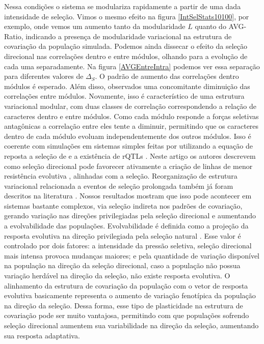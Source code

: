 Nessa condições o sistema se modulariza rapidamente a partir de uma dada
intensidade de seleção.
Vimos o mesmo efeito na figura \ref{IntSelStats10100}, por exemplo, onde
vemos um aumento tanto da modularidade $L$ quanto do AVG-Ratio,
indicando a presença de modularidade variacional na estrutura de
covariação da população simulada.
Podemos ainda dissecar o efeito da seleção direcional nas correlações
dentro e entre módulos, olhando para a evolução de cada uma
separadamente. 
Na figura \ref{AVGEntreIntra} podemos ver essa separação para diferentes
valores de $\Delta_S$. 
O padrão de aumento das correlações dentro módulos é esperado. 
Além disso, observados uma concomitante diminuição das correlações entre
módulos. 
Novamente, isso é característico de uma estrutura variacional modular,
com duas classes de correlação correspondendo a relação de caracteres
dentro e entre módulos.
Como cada módulo responde a forças seletivas antagônicas a correlação
entre eles tente a diminuir, permitindo que os caracteres dentro de cada
módulo evoluam independentemente dos outros módulos. 
Isso é coerente com simulações em sistemas simples feitas por
\cite{Pavlicev2010} utilizando a equação
de reposta a seleção de \cite{Lande1979} e a existência de rQTLs
\citep{Pavlicev2008a}. 
Neste artigo os autores descrevem como seleção direcional pode favorecer
ativamente a criação de linhas de menor resistência evolutiva
\citep[direções do espaço morfológico ricas em
variação, veja][]{Schluter1996},  alinhadas com a seleção. 
Reorganização de estrutura variacional relacionada a eventos de seleção
prolongada também já foram descritos na literatura \citep{Young2010}. 
Nossos resultados mostram que isso pode acontecer em sistemas
bastante complexos, via seleção indireta nos padrões de
covariação, gerando variação nas direções privilegiadas pela seleção
direcional e aumentando a evolvabilidade das populações. 
Evolvabilidade é definida como a projeção da resposta evolutiva na
direção privilegiada pela seleção natural \citep{Hansen2008}.
Esse valor é controlado por dois fatores: a intensidade da pressão
seletiva, seleção direcional mais intensa provoca mudanças maiores; e
pela quantidade de variação disponível na população na direção da
seleção direcional, caso a população não possua variação herdável na
direção da seleção, não existe resposta evolutiva.
O alinhamento da estrutura de covariação da população com o vetor de
resposta evolutiva basicamente representa o aumento de variação
fenotípica da população na direção da seleção.
Dessa forma, esse tipo de plasticidade na estrutura de covariação pode
ser muito vantajosa, permitindo com que populações sofrendo seleção
direcional aumentem sua variabilidade na direção da seleção, aumentando
sua resposta adaptativa.

